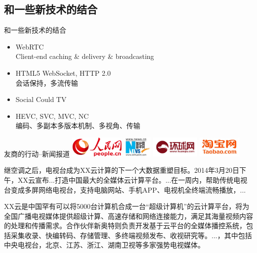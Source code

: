 \documentclass{beamer}
\begin{document}
\subsection{和一些新技术的结合}
\begin{frame}{和一些新技术的结合}
\begin{itemize}
\item WebRTC\\
Client-end caching \& delivery \& broadcasting
\item HTML5 WebSocket, HTTP 2.0\\
会话保持，多流传输
\item Social Could TV\\
\item HEVC, SVC, MVC, NC\\
编码、多副本多版本机制、多视角、传输
\end{itemize}
\end{frame}
\begin{frame}{友商的行动--新闻报道}
\includegraphics[height=1.0cm]{fig/rmw_logo.jpg}
\includegraphics[height=1.0cm]{fig/xinhua_logo.jpg}
\includegraphics[height=1.0cm]{fig/huanqiu_logo.jpg}
\includegraphics[height=1.0cm]{fig/taobao_logo.jpg}\\\pause
\small{
继空调之后，电视台成为XX云计算的下一个大数据重塑目标。2014年3月20日下午，XX云宣布...打造中国最大的全媒体云计算平台。...在一周内，帮助传统电视台变成多屏网络电视台，支持电脑网站、手机APP、电视机全终端流畅播放，...

XX云是中国罕有可以将5000台计算机合成一台“超级计算机”的云计算平台，将为全国广播电视媒体提供超级计算、高速存储和网络连接能力，满足其海量视频内容的处理和传播需求。合作伙伴新奥特则负责开发基于云平台的全媒体播控系统，包括采集收录、快编转码、存储管理、多终端视频发布、收视研究等。...，其中包括中央电视台，北京、江苏、浙江、湖南卫视等多家强势电视媒体。
}
\end{frame}
\end{document}
